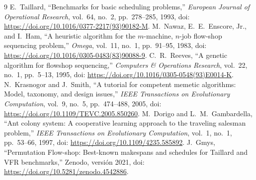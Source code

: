 \documentclass[journal]{IEEEtran}
\begin{document}
\begin{thebibliography}{9}
E.~Taillard, ``Benchmarks for basic scheduling problems,'' \emph{European Journal of Operational Research}, vol.~64, no.~2, pp.~278--285, 1993, doi: \url{https://doi.org/10.1016/0377-2217(93)90182-M}.
M.~Nawaz, E.~E.~Enscore, Jr., and I.~Ham, ``A heuristic algorithm for the $m$-machine, $n$-job flow-shop sequencing problem,'' \emph{Omega}, vol.~11, no.~1, pp.~91--95, 1983, doi: \url{https://doi.org/10.1016/0305-0483(83)90088-9}.
C.~R.~Reeves, ``A genetic algorithm for flowshop sequencing,'' \emph{Computers \& Operations Research}, vol.~22, no.~1, pp.~5--13, 1995, doi: \url{https://doi.org/10.1016/0305-0548(93)E0014-K}.
N.~Krasnogor and J.~Smith, ``A tutorial for competent memetic algorithms: Model, taxonomy, and design issues,'' \emph{IEEE Transactions on Evolutionary Computation}, vol.~9, no.~5, pp.~474--488, 2005, doi: \url{https://doi.org/10.1109/TEVC.2005.850260}.
M.~Dorigo and L.~M.~Gambardella, ``Ant colony system: A cooperative learning approach to the traveling salesman problem,'' \emph{IEEE Transactions on Evolutionary Computation}, vol.~1, no.~1, pp.~53--66, 1997, doi: \url{https://doi.org/10.1109/4235.585892}.
J.~Gmys, ``Permutation Flow-shop: Best-known makespans and schedules for Taillard and VFR benchmarks,'' Zenodo, versión 2021, doi: \url{https://doi.org/10.5281/zenodo.4542886}.
\end{thebibliography}
\end{document}
